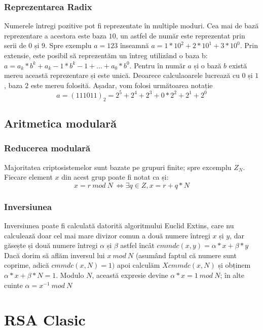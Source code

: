 \documentclass[12]{report}
\begin{document}
      \subsubsection{Reprezentarea Radix}
      Numerele întregi pozitive pot fi reprezentate în multiple moduri. Cea mai de bază reprezentare a acestora este baza $10$, un astfel de număr este reprezentat prin serii de $0$ și $9$. Spre exemplu $ a = 123 $ înseamnă $ a = 1 * 10^2 + 2*10^1 + 3*10^0$. Prin extensie, este posibil să reprezentăm un întreg utilizând o baza b: $ a = a_k * b^k + a_k-1*b^k-1 + ... + a_0*b^0 $. Pentru în număr $a$ și o bază $b$ există mereu această reprezentare și este unică. Deoarece calculaoarele lucrează cu $0$ și $1$, baza $2$ este mereu folosită. Așadar, vom folosi următoarea notație \\
      $$ a=(111011)_2 = 2^5 + 2^4 + 2^3 + 0*2^2 + 2^1 + 2^0 $$
      \subsection{Aritmetica modulară}
       \subsubsection{Reducerea modulară}
        Majoritatea criptosistemelor sunt bazate pe grupuri finite; spre excemplu $ Z_N $. Fiecare element $x$ din acest grup poate fi notat ca și: \\
        $$ x = r  \ mod \ N \ \Leftrightarrow \exists q \in Z , x = r+q*N$$
       \subsubsection{Inversiunea}
         Inversiunea poate fi calculată datorită algoritmului Euclid Extins, care nu calculează doar cel mai mare divizor comun a două numere întregi $x$ și $y$, dar găsește și două numere întregi $ \alpha $ și $  \beta $ astfel încât $ cmmdc(x,y) = \alpha * x + \beta * y$ \\
        Dacă dorim să aflăm inversul lui  $x \ mod \ N$ (asumând faptul că numere sunt coprime, adică $cmmdc(x,N)=1)$ apoi calculăm $Xcmmdc(x,N)$ și obținem $ \alpha * x + \beta * N = 1$. Modulo $N$, această expresie devine $\alpha * x  = 1 \ mod \ N$; în alte cuinte $\alpha= x^{-1} \ mod \ N$
        
       
    \section{RSA Clasic}
\end{document}
